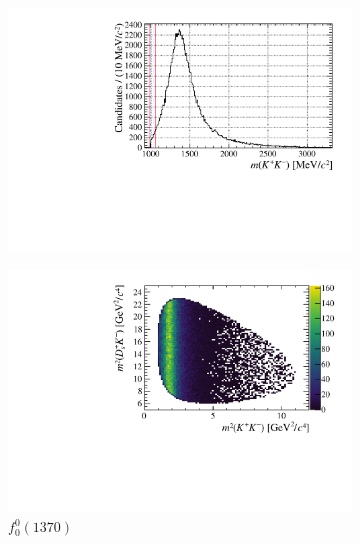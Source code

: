 \begin{figure}[!ht]
    \centering

    \begin{subfigure}[t]{0.32\textwidth}    
        \centering 
        \includegraphics[width=1.0\textwidth]{figs/B2DsPhi/f0_1370_phi_mass.pdf}
    \end{subfigure}
    \begin{subfigure}[t]{0.32\textwidth}    
        \centering 
        \includegraphics[width=1.0\textwidth]{figs/B2DsPhi/f0_1370_Dalitz_plot.pdf}
        \caption{$f_{0}^{0}(1370)$}  
    \end{subfigure}
    \begin{subfigure}[t]{0.32\textwidth}    

\end{subfigure}
\end{figure}

